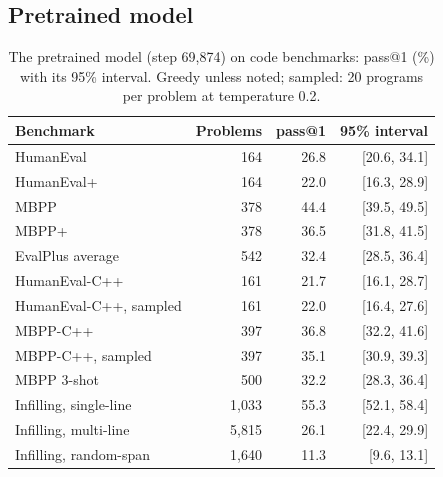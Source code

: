 \documentclass[sigconf,nonacm,balance=false]{acmart}
\begin{document}
\subsection{Pretrained model}
\label{sec:results-base}

\begin{table}
  \caption{The pretrained model (step 69,874) on code benchmarks: pass@1 (\%) with its 95\% interval. Greedy unless
  noted; sampled: 20 programs per problem at temperature 0.2.}
  \label{tab:base-results}
  \small
  \setlength{\tabcolsep}{4pt}
  \begin{tabular}{lrrr}
    \toprule
    Benchmark & Problems & pass@1 & 95\% interval \\
    \midrule
    HumanEval & 164 & 26.8 & [20.6, 34.1] \\
    HumanEval+ & 164 & 22.0 & [16.3, 28.9] \\
    MBPP & 378 & 44.4 & [39.5, 49.5] \\
    MBPP+ & 378 & 36.5 & [31.8, 41.5] \\
    EvalPlus average & 542 & 32.4 & [28.5, 36.4] \\
    \midrule
    HumanEval-C++ & 161 & 21.7 & [16.1, 28.7] \\
    HumanEval-C++, sampled & 161 & 22.0 & [16.4, 27.6] \\
    MBPP-C++ & 397 & 36.8 & [32.2, 41.6] \\
    MBPP-C++, sampled & 397 & 35.1 & [30.9, 39.3] \\
    \midrule
    MBPP 3-shot & 500 & 32.2 & [28.3, 36.4] \\
    \midrule
    Infilling, single-line & 1,033 & 55.3 & [52.1, 58.4] \\
    Infilling, multi-line & 5,815 & 26.1 & [22.4, 29.9] \\
    Infilling, random-span & 1,640 & 11.3 & [9.6, 13.1] \\
    \bottomrule
  \end{tabular}
\end{table}
\end{document}
